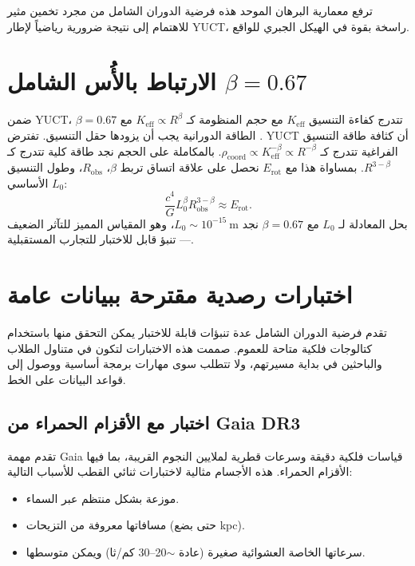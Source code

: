 \documentclass[12pt,a4paper]{article}
\newcommand{\Keff}{K_{\mathrm{eff}}}
\begin{document}
	ترفع معمارية البرهان الموحد هذه فرضية الدوران الشامل من مجرد تخمين مثير للاهتمام إلى نتيجة ضرورية رياضياً لإطار YUCT، راسخة بقوة في الهيكل الجبري للواقع.
	
	\section{الارتباط بالأُس الشامل \(\beta = 0.67\)}
	
	ضمن YUCT، تتدرج كفاءة التنسيق \(\Keff\) مع حجم المنظومة كـ \(\Keff \propto R^{\beta}\) مع \(\beta = 0.67\) \cite{AppendixL}. الطاقة الدورانية يجب أن يزودها حقل التنسيق. تفترض YUCT أن كثافة طاقة التنسيق الفراغية تتدرج كـ \(\rho_{\text{coord}} \propto \Keff^{-\beta} \propto R^{-\beta}\). بالمكاملة على الحجم نجد طاقة كلية تتدرج كـ \(R^{3-\beta}\). بمساواة هذا مع \(E_{\text{rot}}\) نحصل على علاقة اتساق تربط \(\beta\)، \(R_{\text{obs}}\)، وطول التنسيق الأساسي \(L_0\):
	\begin{equation}
		\frac{c^4}{G} L_0^{\beta} R_{\text{obs}}^{3-\beta} \approx E_{\text{rot}}.
	\end{equation}
	بحل المعادلة لـ \(L_0\) مع \(\beta = 0.67\) نجد \(L_0 \sim 10^{-15}\ \text{m}\)، وهو المقياس المميز للتآثر الضعيف — تنبؤ قابل للاختبار للتجارب المستقبلية.
	
	\section{اختبارات رصدية مقترحة ببيانات عامة}
	
	تقدم فرضية الدوران الشامل عدة تنبؤات قابلة للاختبار يمكن التحقق منها باستخدام كتالوجات فلكية متاحة للعموم. صممت هذه الاختبارات لتكون في متناول الطلاب والباحثين في بداية مسيرتهم، ولا تتطلب سوى مهارات برمجة أساسية ووصول إلى قواعد البيانات على الخط.
	
	\subsection{اختبار مع الأقزام الحمراء من Gaia DR3}
	
	تقدم مهمة Gaia قياسات فلكية دقيقة وسرعات قطرية لملايين النجوم القريبة، بما فيها الأقزام الحمراء. هذه الأجسام مثالية لاختبارات ثنائي القطب للأسباب التالية:
	\begin{itemize}
		\item موزعة بشكل منتظم عبر السماء.
		\item مسافاتها معروفة من التزيحات (حتى بضع kpc).
		\item سرعاتها الخاصة العشوائية صغيرة (عادة \(\sim\)20--30 كم/ثا) ويمكن متوسطها.
	\end{itemize}
	
\end{document}
